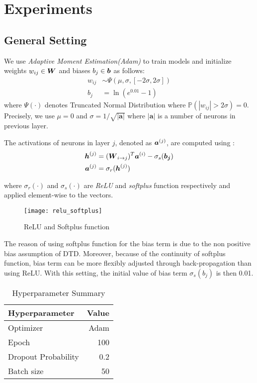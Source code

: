 \chapter{Experiments}
\label{cha:chapter4}


\section{General Setting}\label{sec:setup}
 
 We use \textit{Adaptive Moment Estimation(Adam)}\cite{KingmaAdamMethodStochastic2014} to train models and initialize weights $w_{ij} \in \patmatrix{W}$ and biases $b_{j} \in \patvector{b}$ as follows:
\begin{align*}
	w_{ij} &\sim \Psi( \mu, \sigma, [-2\sigma, 2\sigma]) \\
	b_{j} &= \ln(e^{0.01} - 1)
\end{align*}
where $\Psi(\cdot)$ denotes Truncated Normal Distribution where $\mathbb{P}(|w_{ij}| > 2\sigma) = 0$. Precisely, we use $\mu=0$ and $\sigma = 1/\sqrt{|\boldsymbol{a}|}$ where $|\boldsymbol{a}|$ is a number of neurons in previous layer.

The activations of neurons in layer $j$, denoted as $\patvector{a}^{(j)}$, are computed using :
\begin{align*}
\patvector{h}^{(j)}  &=  	(\patmatrix{W}_{ i \rightarrow j })^T \patvector{a}^{(i)} - \sigma_{s}(\patvector{b_j}) \\
	\patvector{a}^{(j)}  &=  	\sigma_{r} (	\patvector{h}^{(j)} )
\end{align*}

where $\sigma_r(\cdot)$ and $\sigma_s(\cdot)$ are \textit{ReLU} and \textit{softplus} function respectively and applied element-wise to the vectors.

 \begin{figure}[!hbt]
\centering
\texttt{[image: relu\_softplus]}
\caption{ReLU and Softplus function} 
\label{fig:relu_softplus}
\end{figure}


The reason of using softplus function for the bias term is due to the non positive bias assumption of DTD. Moreover, because of the continuity of softplus function, bias term can be more flexibly adjusted through back-propagation than using  ReLU. With this setting, the initial value of bias term  $\sigma_{s}(b_j)$ is then 0.01.


\begin{table}[!htb]
\centering
\begin{tabular}{l|r}
\textbf{Hyperparameter} & \multicolumn{1}{l}{\textbf{Value}} \\ \hline
Optimizer               & Adam                               \\
Epoch     & 100                                \\
Dropout Probability     & 0.2                               \\
Batch size              & 50                                
\end{tabular}
\caption{Hyperparameter Summary}
\label{tab:hyper_summary}
\end{table}


